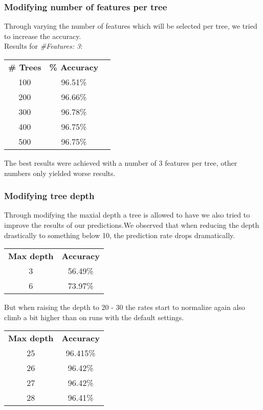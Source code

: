\documentclass{article}
\begin{document}
\subsubsection{Modifying number of features per tree}
Through varying the number of features which will be selected per tree, we tried to increase the accuracy. \\
Results for \emph{\#Features: 3}:\\
\begin{center}
\begin{tabular}{ c | c | c }
\textbf{\# Trees} & \textbf{\% Accuracy} \\
100 & 96.51\% \\
200 & 96.66\% \\
300 & 96.78\% \\
400 & 96.75\% \\
500 & 96.75\% \\
\end{tabular}
\end{center}
The best results were achieved with a number of 3 features per tree, other numbers only yielded worse results.

\subsubsection{Modifying tree depth}
Through modifying the maxial depth a tree is allowed to have we also tried to improve the results of our predictions.We observed that when reducing the depth drastically to something below 10, the prediction rate drops dramatically. 

\begin{center}
\begin{tabular}{c | c }
\textbf{Max depth} & \textbf{Accuracy}\\
3 & 56.49\%\\
6 & 73.97\%
\end{tabular}
\end{center}

But when raising the depth to 20 - 30 the rates start to normalize again also climb a bit higher than on runs with the default settings.
\begin{center}

\begin{tabular}{c | c }
\textbf{Max depth} & \textbf{Accuracy}\\
25 & 96.415\%\\
26 & 96.42\%\\
27 & 96.42\%\\
28 & 96.41\%\\
\end{tabular}
\end{center}
\end{document}
